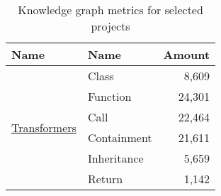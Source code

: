 \begin{table}[h]
\centering
\begin{threeparttable}
\begin{tabularx}{\linewidth}{lXr}

\toprule
\textbf{Name} & \textbf{Name} & \textbf{Amount} \\
\midrule

\multirow{6}[12]{*}{\href{https://github.com/huggingface/transformers}{Transformers}}   
                                & Class  & 8,609 \\ \cmidrule{2-3}
                                & Function  & 24,301 \\ \cmidrule{2-3}
                                & Call  & 22,464 \\ \cmidrule{2-3}
                                & Containment  & 21,611 \\ \cmidrule{2-3}
                                & Inheritance  & 5,659 \\ \cmidrule{2-3}
                                & Return  & 1,142 \\
\bottomrule
\end{tabularx}
\caption{Knowledge graph metrics for selected projects}
\label{tab:graph-metrics}
\end{threeparttable}
\end{table}

